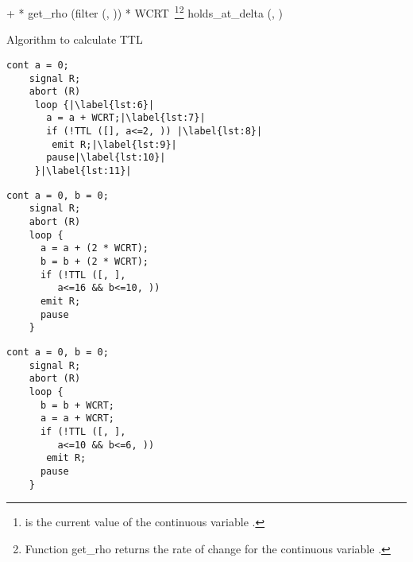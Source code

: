 \documentclass[10pt,journal,cspaper,compsoc]{IEEEtran}
\begin{document}
\begin{algorithm}[t!]
  \begin{minipage}{1.0\linewidth}
      \;
     {
         +  * get\_rho (filter
      (, )) * WCRT~\footnote{ is the current
        value of the continuous variable .}\footnote{Function
        get\_rho returns the rate of change for the continuous variable
        .}\label{alg:1:l1}\;
        \;
    }
    \Return holds\_at\_delta (, )\;
    \caption{Algorithm to calculate TTL}
    \label{alg:1}
  \end{minipage}
\end{algorithm}

\newbox{\rfirst}
\begin{lrbox}{\rfirst}
  \begin{lstlisting}[mathescape,style=sysj,morekeywords={until,wait_inbetween,cont,signal,loop,abort,await,emit,present,trap,pause,exit,delay,suspend},escapechar=|]
    cont a = 0;
    signal R;
    abort (R) 
     loop {|\label{lst:6}|
       a = a + WCRT;|\label{lst:7}|
       if (!TTL ([], a<=2, )) |\label{lst:8}|
        emit R;|\label{lst:9}|
       pause|\label{lst:10}|
     }|\label{lst:11}|
  \end{lstlisting}
\end{lrbox}

\newbox{\rsecond}
\begin{lrbox}{\rsecond}
  \begin{lstlisting}[mathescape,style=sysj,morekeywords={until,wait_inbetween,cont,signal,loop,abort,await,emit,present,trap,pause,exit,delay,suspend}]
    cont a = 0, b = 0;
    signal R;
    abort (R) 
    loop {
      a = a + (2 * WCRT);
      b = b + (2 * WCRT);
      if (!TTL ([, ], 
         a<=16 && b<=10, )) 
      emit R;
      pause
    }
  \end{lstlisting}
\end{lrbox}

\newbox{\rthird}
\begin{lrbox}{\rthird}
  \begin{lstlisting}[mathescape,style=sysj,morekeywords={until,wait_inbetween,cont,signal,loop,abort,await,emit,present,trap,pause,exit,delay,suspend}]
    cont a = 0, b = 0;
    signal R;
    abort (R) 
    loop {
      b = b + WCRT;
      a = a + WCRT;
      if (!TTL ([, ], 
         a<=10 && b<=6, )) 
       emit R;
      pause
    }
  \end{lstlisting}
\end{lrbox}
\end{document}
